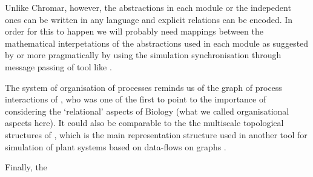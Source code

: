 \documentclass[phd]{infthesis}
\begin{document}
Unlike Chromar, however, the abstractions in each module or the indepedent ones
can be written in any language and explicit relations can be encoded. In order
for this to happen we will probably need mappings between the mathematical
interpetations of the abstractions used in each module as suggested by
\citet{mjolsness_prospects_2018} or more pragmatically by using the simulation
synchronisation through message passing of tool like \citet{cis_2018}.

The system of organisation of processes reminds us of the graph of process
interactions of \citet{rashevsky_topology_1954}, who was one of the first to
point to the importance of considering the `relational' aspects of Biology (what
we called organisational aspects here). It could also be comparable to the the
multiscale topological structures of \citet{godin_multiscale_1998}, which is the
main representation structure used in another tool for simulation of plant
systems based on data-flows on graphs
\citep[OpenAlea;][]{pradal_openalea:_2008}.

Finally, the 
















\end{document}
